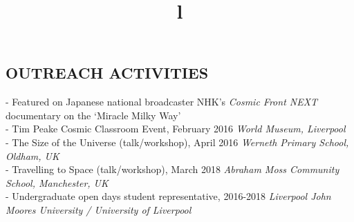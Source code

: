 \documentclass[margin]{res}
\begin{document}
\begin{resume}
\section{OUTREACH ACTIVITIES}
\par
- Featured on Japanese national broadcaster NHK's \emph{Cosmic Front NEXT} documentary on the `Miracle Milky Way'\\
- Tim Peake Cosmic Classroom Event, February 2016 \emph{World Museum, Liverpool}\\
- The Size of the Universe (talk/workshop), April 2016 \emph{Werneth Primary School, Oldham, UK}\\
- Travelling to Space (talk/workshop), March 2018 \emph{Abraham Moss Community School, Manchester, UK}\\
- Undergraduate open days student representative, 2016-2018 \emph{Liverpool John Moores University / University of Liverpool}


\begin{format}
\title{l}\\
\\
\body\\
\end{format}

\end{resume}
\end{document}
